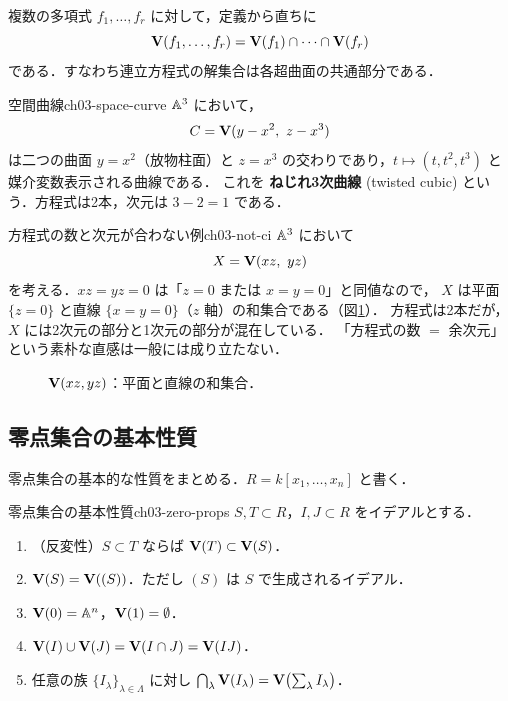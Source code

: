 複数の多項式 $f_1,\dots,f_r$ に対して，定義から直ちに
\[
  \mathbf{V}(f_1,\dots,f_r) = \mathbf{V}(f_1)\cap\cdots\cap\mathbf{V}(f_r)
\]
である．すなわち連立方程式の解集合は各超曲面の共通部分である．

\begin{myex}{空間曲線}{ch03-space-curve}
$\mathbb{A}^3$ において，
\[
  C = \mathbf{V}(y-x^2,\ z-x^3)
\]
は二つの曲面 $y=x^2$（放物柱面）と $z=x^3$ の交わりであり，$t\mapsto (t,t^2,t^3)$ と媒介変数表示される曲線である．
これを \textbf{ねじれ3次曲線} (twisted cubic) という．方程式は2本，次元は $3-2=1$ である．
\end{myex}

\begin{myex}{方程式の数と次元が合わない例}{ch03-not-ci}
$\mathbb{A}^3$ において
\[
  X = \mathbf{V}(xz,\ yz)
\]
を考える．$xz=yz=0$ は「$z=0$ または $x=y=0$」と同値なので，
$X$ は平面 $\{z=0\}$ と直線 $\{x=y=0\}$（$z$ 軸）の和集合である（図\ref{fig:ch03-plane-line}）．
方程式は2本だが，$X$ には2次元の部分と1次元の部分が混在している．
「方程式の数 $=$ 余次元」という素朴な直感は一般には成り立たない．
\end{myex}

\begin{figure}[H]
\centering
{}
\caption{$\mathbf{V}(xz,yz)$：平面と直線の和集合．}
\label{fig:ch03-plane-line}
\end{figure}

\subsection{零点集合の基本性質}

零点集合の基本的な性質をまとめる．$R=k[x_1,\dots,x_n]$ と書く．

\begin{myprop}{零点集合の基本性質}{ch03-zero-props}
$S,T\subset R$，$I,J\subset R$ をイデアルとする．
\begin{enumerate}
  \item（反変性）$S\subset T$ ならば $\mathbf{V}(T)\subset\mathbf{V}(S)$．
  \item $\mathbf{V}(S)=\mathbf{V}((S))$．ただし $(S)$ は $S$ で生成されるイデアル．
  \item $\mathbf{V}(0)=\mathbb{A}^n$，$\mathbf{V}(1)=\emptyset$．
  \item $\mathbf{V}(I)\cup\mathbf{V}(J)=\mathbf{V}(I\cap J)=\mathbf{V}(IJ)$．
  \item 任意の族 $\{I_\lambda\}_{\lambda\in\Lambda}$ に対し $\bigcap_\lambda\mathbf{V}(I_\lambda)=\mathbf{V}\bigl(\sum_\lambda I_\lambda\bigr)$．
\end{enumerate}
\end{myprop}

